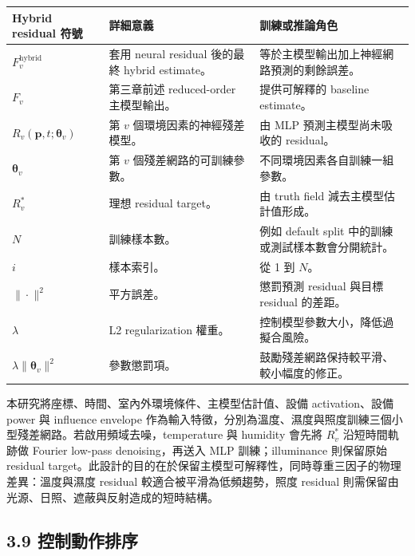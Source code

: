 \documentclass[12pt,a4paper]{article}
\begin{document}
\begin{table}[htbp]
\centering
\footnotesize
\renewcommand{\arraystretch}{1.25}
\begin{tabular}{|>{\raggedright\arraybackslash}p{}|>{\raggedright\arraybackslash}p{}|>{\raggedright\arraybackslash}p{}|}
\hline
\textbf{Hybrid residual 符號} & \textbf{詳細意義} & \textbf{訓練或推論角色} \\
\hline
$F_v^{\text{hybrid}}$ & 套用 neural residual 後的最終 hybrid estimate。 & 等於主模型輸出加上神經網路預測的剩餘誤差。 \\
\hline
$F_v$ & 第三章前述 reduced-order 主模型輸出。 & 提供可解釋的 baseline estimate。 \\
\hline
$R_v(\mathbf{p},t;\boldsymbol{\theta}_v)$ & 第 $v$ 個環境因素的神經殘差模型。 & 由 MLP 預測主模型尚未吸收的 residual。 \\
\hline
$\boldsymbol{\theta}_v$ & 第 $v$ 個殘差網路的可訓練參數。 & 不同環境因素各自訓練一組參數。 \\
\hline
$R_v^*$ & 理想 residual target。 & 由 truth field 減去主模型估計值形成。 \\
\hline
$N$ & 訓練樣本數。 & 例如 default split 中的訓練或測試樣本數會分開統計。 \\
\hline
$i$ & 樣本索引。 & 從 1 到 $N$。 \\
\hline
$\|\cdot\|^2$ & 平方誤差。 & 懲罰預測 residual 與目標 residual 的差距。 \\
\hline
$\lambda$ & L2 regularization 權重。 & 控制模型參數大小，降低過擬合風險。 \\
\hline
$\lambda\|\boldsymbol{\theta}_v\|^2$ & 參數懲罰項。 & 鼓勵殘差網路保持較平滑、較小幅度的修正。 \\
\hline
\end{tabular}
\end{table}

本研究將座標、時間、室內外環境條件、主模型估計值、設備 activation、設備 power 與 influence envelope 作為輸入特徵，分別為溫度、濕度與照度訓練三個小型殘差網路。若啟用頻域去噪，temperature 與 humidity 會先將 $R_v^*$ 沿短時間軌跡做 Fourier low-pass denoising，再送入 MLP 訓練；illuminance 則保留原始 residual target。此設計的目的在於保留主模型可解釋性，同時尊重三因子的物理差異：溫度與濕度 residual 較適合被平滑為低頻趨勢，照度 residual 則需保留由光源、日照、遮蔽與反射造成的短時結構。


\subsection*{3.9 控制動作排序}
\end{document}
